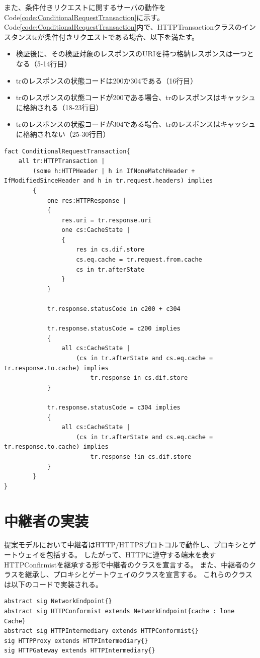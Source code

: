 \documentclass[12pt,a4paper]{jbook}
\begin{document}
また、条件付きリクエストに関するサーバの動作をCode\ref{code:ConditionalRequestTransaction}に示す。
Code\ref{code:ConditionalRequestTransaction}内で、HTTPTransactionクラスのインスタンスtrが条件付きリクエストである場合、以下を満たす。
\begin{itemize}
\item 検証後に、その検証対象のレスポンスのURIを持つ格納レスポンスは一つとなる（5-14行目）
\item trのレスポンスの状態コードは200か304である（16行目）
\item trのレスポンスの状態コードが200である場合、trのレスポンスはキャッシュに格納される（18-23行目）
\item trのレスポンスの状態コードが304である場合、trのレスポンスはキャッシュに格納されない（25-30行目）
\end{itemize}

\begin{lstlisting}[caption=条件付きリクエストに対するサーバの動作, label=code:ConditionalRequestTransaction]
fact ConditionalRequestTransaction{
	all tr:HTTPTransaction |
		(some h:HTTPHeader | h in IfNoneMatchHeader + IfModifiedSinceHeader and h in tr.request.headers) implies
		{
			one res:HTTPResponse |
			{
				res.uri = tr.response.uri
				one cs:CacheState |
				{
					res in cs.dif.store
					cs.eq.cache = tr.request.from.cache
					cs in tr.afterState
				}
			}

			tr.response.statusCode in c200 + c304

			tr.response.statusCode = c200 implies
			{
				all cs:CacheState |
					(cs in tr.afterState and cs.eq.cache = tr.response.to.cache) implies
						tr.response in cs.dif.store
			}

			tr.response.statusCode = c304 implies
			{
				all cs:CacheState |
					(cs in tr.afterState and cs.eq.cache = tr.response.to.cache) implies
						tr.response !in cs.dif.store
			}
		}
}
\end{lstlisting}

\section{中継者の実装}
提案モデルにおいて中継者はHTTP/HTTPSプロトコルで動作し、プロキシとゲートウェイを包括する。
したがって、HTTPに遵守する端末を表すHTTPConfirmistを継承する形で中継者のクラスを宣言する。
また、中継者のクラスを継承し、プロキシとゲートウェイのクラスを宣言する。
これらのクラスは以下のコードで実装される。

\begin{lstlisting}[caption=中継者、プロキシ、ゲートウェイのクラス, label=code:IntermediaryClass]
abstract sig NetworkEndpoint{}
abstract sig HTTPConformist extends NetworkEndpoint{cache : lone Cache}
abstract sig HTTPIntermediary extends HTTPConformist{}
sig HTTPProxy extends HTTPIntermediary{}
sig HTTPGateway extends HTTPIntermediary{}
\end{lstlisting}
\end{document}
